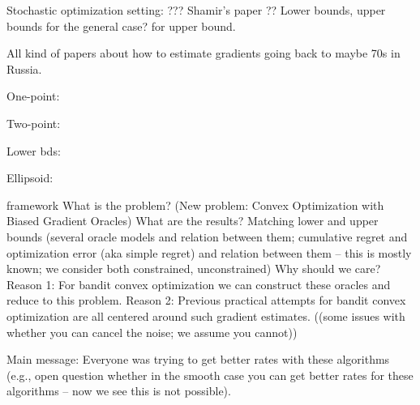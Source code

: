 Stochastic optimization setting: ??? Shamir's paper \cite{shamir2012complexity}??
Lower bounds, upper bounds for the general case?
\cite{hazan2014bandit} for upper bound.

All kind of papers about how to estimate gradients going back to maybe 70s in Russia.

One-point: \cite{flaxman2005online}

Two-point: \cite{AgDeXi10}

Lower bds: \cite{raginsky2011information} \cite{Chen88:LB-AoS}

Ellipsoid: \cite{AgFoHsuKaRa13:SIAM}



 framework
What is the problem? (New problem: Convex Optimization with Biased Gradient Oracles)
What are the results? Matching lower and upper bounds (several oracle models and relation between them; cumulative regret and optimization error (aka simple regret) and relation between them -- this is mostly known; we consider both constrained, unconstrained)
Why should we care? 
Reason 1: For bandit convex optimization we can construct these oracles and reduce to this problem.
Reason 2: Previous practical attempts for bandit convex optimization are all centered around such gradient estimates.
((some issues with whether you can cancel the noise; we assume you cannot))

Main message: Everyone was trying to get better rates with these algorithms (e.g., open question whether in the smooth case you can get better rates for these algorithms -- now we see this is not possible).
\fi

